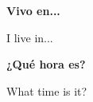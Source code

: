 \documentclass[avery5388,grid]{flashcards}
\begin{document}
\begin{flashcard}[Vocabulary]{\textbf{Vivo en...}}
    \begin{center}
        I live in...
    \end{center}
\end{flashcard}

\begin{flashcard}[Vocabulary]{\textbf{¿Qué hora es?}}
    \begin{center}
        What time is it?
    \end{center}
\end{flashcard}
\end{document}
